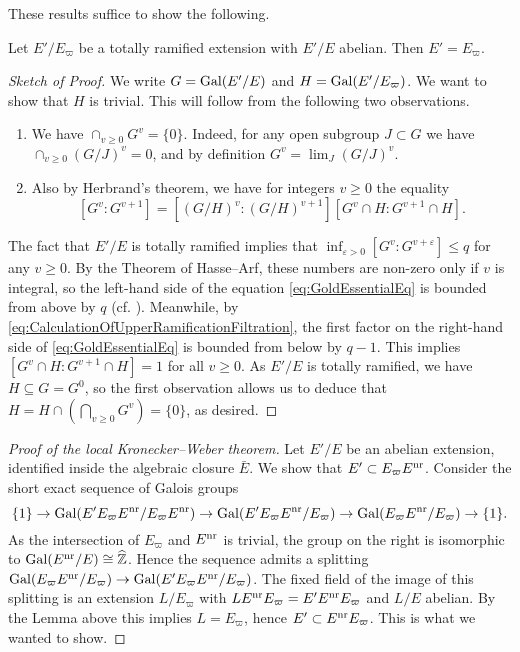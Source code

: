 \documentclass[../main.tex]{subfiles}
\begin{document}
These results suffice to show the following.

\begin{lem}\label{lem:LocalKronWebAlmostDone}
  Let $E'/E_\varpi$ be a totally ramified extension with $E'/E$ abelian.
  Then $E' = E_\varpi$. 
\begin{proof}[Sketch of Proof]
  We write $G = \operatorname{Gal}(E'/E)$ and $H = \operatorname{Gal}(E'/E_\varpi)$. We want to show that 
  $H$ is trivial. This will follow from the following two observations.
  \begin{enumerate}
    \item We have $\cap_{v \geq 0} G^v = \{0\}$. Indeed, for any open subgroup
      $J \subset G$ we have $\cap_{v \geq 0} (G/J)^v = 0$, and by definition
      $G^v = \lim_J (G/J)^v$. 
    \item Also by Herbrand's theorem, we have for integers $v \geq 0$ the equality
      \begin{equation}\label{eq:GoldEssentialEq}
        [G^v : G^{v+1}] = [(G/H)^v : (G/H)^{v+1}] [G^v \cap H : G^{v+1} \cap H].
      \end{equation}
  \end{enumerate}
  The fact that $E'/E$ is totally ramified implies that $\inf_{\varepsilon > 0}
  [G^v: G^{v+\varepsilon}] \leq q$ for any $v \geq 0$. By the Theorem of 
  Hasse--Arf, these numbers are non-zero only if $v$ is integral, so
  the left-hand side of the equation \eqref{eq:GoldEssentialEq} is bounded from
  above by $q$ (cf. \cite[Lemma 3]{gold1981local}).
  Meanwhile, by \eqref{eq:CalculationOfUpperRamificationFiltration}, the first factor
  on the right-hand side of \eqref{eq:GoldEssentialEq} is bounded from below by
  $q-1$. This implies $[G^v \cap H : G^{v+1} \cap H] = 1$ for all $v \geq 0$. As $E'/E$ is totally ramified, we have
  $H \subseteq G = G^0$, so the first observation allows us
  to deduce that $H = H \cap \left( \bigcap_{v \geq 0} G^v \right) = \{0\}$, as desired.
\end{proof}
\end{lem}

\begin{proof}[Proof of the local Kronecker--Weber theorem]
  Let $E'/E$ be an abelian extension, identified inside the 
  algebraic closure $\bar E$. We show that $E' \subset E_\varpi E^{\mathrm{nr}}$. 
  Consider the short exact sequence of Galois groups
  \begin{equation*}
    \{1\} \to \operatorname{Gal}(E' E_\varpi E^{\mathrm{nr}}/ E_\varpi E^{\mathrm{nr}}) \to 
    \operatorname{Gal}(E' E_\varpi E^{\mathrm{nr}}/ E_\varpi) \to 
    \operatorname{Gal}(E_\varpi E^{\mathrm{nr}}/ E_\varpi) \to  \{1\}.
  \end{equation*}
  As the intersection of  $E_\varpi$ and $E^{\mathrm{nr}}$ is trivial, the group on the right
  is isomorphic to $\operatorname{Gal}(E^{\mathrm{nr}} /E) \cong \widehat {\mathbb{Z}}$. Hence the sequence admits 
  a splitting $\operatorname{Gal}(E_\varpi E^{\mathrm{nr}}/ E_\varpi) \to \operatorname{Gal}(E' E_\varpi E^{\mathrm{nr}}/
  E_\varpi)$. The fixed field of the image of this splitting is an extension
  $L/E_\varpi$ with $L E^{\mathrm{nr}} E_\varpi = E' E^{\mathrm{nr}} E_\varpi$ and $L/E$ abelian.
  By the Lemma above this implies $L = E_\varpi$, hence $E' \subset E^{\mathrm{nr}} E_\varpi$.
  This is what we wanted to show.
\end{proof}


\end{document}
